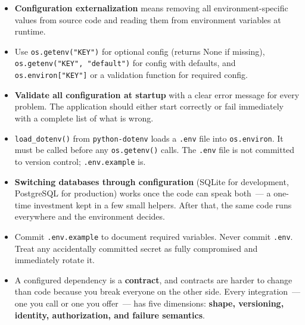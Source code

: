 \label{13-configuration-externalization:key-takeaways}
\begin{takeaways}

\begin{itemize}
\tightlist
\item
  \textbf{Configuration externalization} means removing all environment-specific values from source code and reading them from environment variables at runtime.
\item
  Use \texttt{os.getenv("KEY")} for optional config (returns None if missing), \texttt{os.}\allowbreak{}\texttt{getenv("KEY",}\allowbreak{}\texttt{\ "default")} for config with defaults, and \texttt{os.environ{[}"KEY"{]}} or a validation function for required config.
\item
  \textbf{Validate all configuration at startup} with a clear error message for every problem. The application should either start correctly or fail immediately with a complete list of what is wrong.
\item
  \texttt{load\_dotenv()} from \texttt{python-dotenv} loads a \texttt{.env} file into \texttt{os.environ}. It must be called before any \texttt{os.getenv()} calls. The \texttt{.env} file is not committed to version control; \texttt{.env.example} is.
\item
  \textbf{Switching databases through configuration} (SQLite for development, PostgreSQL for production) works once the code can speak both~--- a one-time investment kept in a few small helpers. After that, the same code runs everywhere and the environment decides.
\item
  Commit \texttt{.env.example} to document required variables. Never commit \texttt{.env}. Treat any accidentally committed secret as fully compromised and immediately rotate it.
\item
  A configured dependency is a \textbf{contract}, and contracts are harder to change than code because you break everyone on the other side. Every integration~--- one you call or one you offer~--- has five dimensions: \textbf{shape, versioning, identity, authorization, and failure semantics}.
\end{itemize}

\end{takeaways}

\label{13-configuration-externalization:exercises}

